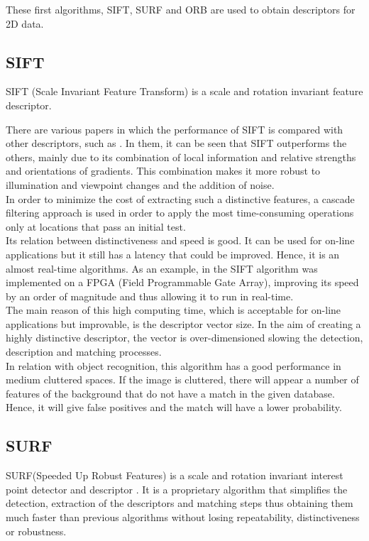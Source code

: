 These first algorithms, SIFT, SURF and ORB are used to obtain descriptors for 2D data. 

\subsection{SIFT}

SIFT (Scale Invariant Feature Transform) is a scale and rotation invariant feature descriptor\cite{sift}. 

There are various papers in which the performance of SIFT is compared with other descriptors, such as \cite{Mikolajczyk2005}. In them, it can be seen that SIFT outperforms the others, mainly due to its combination of local information and relative strengths and orientations of gradients. This combination makes it more robust to illumination and viewpoint changes and the addition of noise. 
\\

In order to minimize the cost of extracting such a distinctive features, a cascade filtering approach is used in order to apply the most time-consuming operations only at locations that pass an initial test. 
\\

Its relation between distinctiveness and speed is good. It can be used for on-line applications but it still has a latency that could be improved. Hence, it is an almost real-time algorithms. As an example, in \cite{sift_fpga} the SIFT algorithm was implemented on a FPGA (Field Programmable Gate Array), improving its speed by an order of magnitude and thus allowing it to run in real-time.
\\

The main reason of this high computing time, which is acceptable for on-line applications but improvable, is the descriptor vector size. In the aim of creating a highly distinctive descriptor, the vector is over-dimensioned slowing the detection, description and matching processes. 
\\

In relation with object recognition, this algorithm has a good performance in medium cluttered spaces. If the image is cluttered, there will appear a number of features of the background that do not have a match in the given database. Hence, it will give false positives and the match will have a lower probability. 




\subsection{SURF}
SURF(Speeded Up Robust Features) is a scale and rotation invariant interest point detector and descriptor \cite{surf}. 
It is a proprietary algorithm that simplifies the detection, extraction of the descriptors and matching steps thus obtaining them much faster than previous algorithms without losing repeatability, distinctiveness or robustness. 
\\

